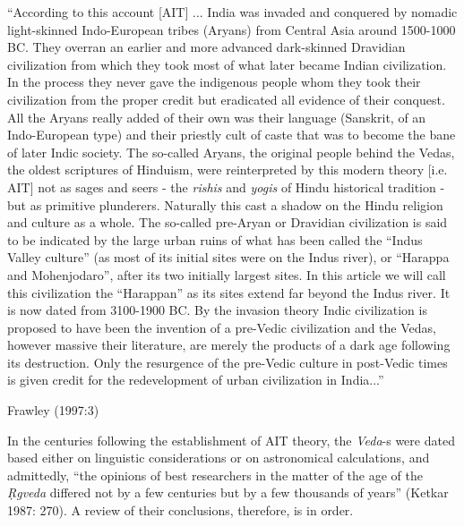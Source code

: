 \begin{myquote}
“According to this account [AIT] ... India was invaded and conquered by nomadic light-skinned Indo-European tribes (Aryans) from Central Asia around 1500-1000 BC. They overran an earlier and more advanced dark-skinned Dravidian civilization from which they took most of what later became Indian civilization. In the process they never gave the indigenous people whom they took their civilization from the proper credit but eradicated all evidence of their conquest. All the Aryans really added of their own was their language (Sanskrit, of an Indo-European type) and their priestly cult of caste that was to become the bane of later Indic society. The so-called Aryans, the original people behind the Vedas, the oldest scriptures of Hinduism, were reinterpreted by this modern theory [i.e. AIT] not as sages and seers - the {\sl rishis} and {\sl yogis} of Hindu historical tradition - but as primitive plunderers. Naturally this cast a shadow on the Hindu religion and culture as a whole. The so-called pre-Aryan or Dravidian civilization is said to be indicated by the large urban ruins of what has been called the “Indus Valley culture” (as most of its initial sites were on the Indus river), or “Harappa and Mohenjodaro”, after its two initially largest sites. In this article we will call this civilization the “Harappan” as its sites extend far beyond the Indus river. It is now dated from 3100-1900 BC. By the invasion theory Indic civilization is proposed to have been the invention of a pre-Vedic civilization and the Vedas, however massive their literature, are merely the products of a dark age following its destruction. Only the resurgence of the pre-Vedic culture in post-Vedic times is given credit for the redevelopment of urban civilization in India...”

\hfill Frawley (1997:3)
\end{myquote}

In the centuries following the establishment of AIT theory, the {\sl Veda}-s were dated based either on linguistic considerations or on astronomical calculations, and admittedly, “the opinions of best researchers in the matter of the age of the {\sl Ṛgveda} differed not by a few centuries but by a few thousands of years” (Ketkar 1987: 270). A review of their conclusions, therefore, is in order. 

